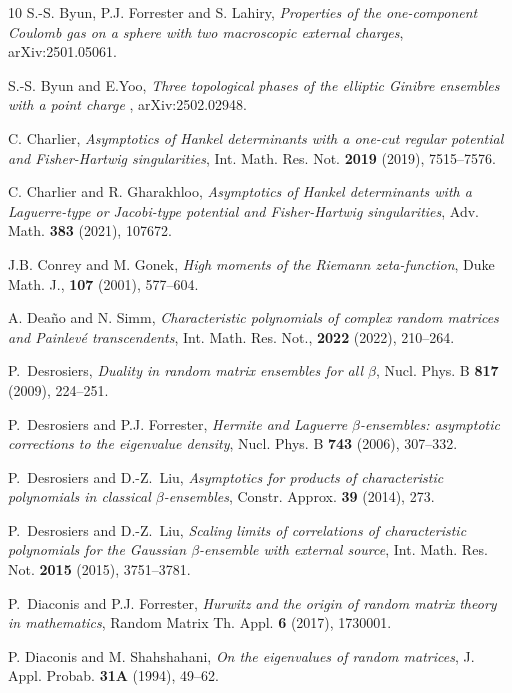 \documentclass[11pt,a4paper]{article}
\numberwithin{equation}{section} %
\theoremstyle{plain}
\theoremstyle{definition}
\numberwithin{prop}{section}
\numberwithin{cor}{section}
\numberwithin{remark}{section}
\begin{document}
\begin{thebibliography}{10}
S.-S. Byun, P.J. Forrester and S. Lahiry, \emph{Properties of the one-component Coulomb gas on a sphere
with two macroscopic external charges}, arXiv:2501.05061. 


S.-S. Byun and E.Yoo, \emph{Three topological phases of the elliptic Ginibre ensembles with a point charge }, arXiv:2502.02948.
  
  C. Charlier, \emph{Asymptotics of Hankel determinants with a one-cut regular potential and Fisher-Hartwig singularities}, Int. Math.
Res. Not.  \textbf{2019} (2019), 7515--7576.

C. Charlier and R. Gharakhloo, \emph{Asymptotics of Hankel determinants with a Laguerre-type or Jacobi-type potential and Fisher-Hartwig singularities}, Adv. Math. \textbf{383} (2021), 107672.
  
  J.B. Conrey and M. Gonek, \emph{High moments of the Riemann zeta-function}, Duke
Math. J., \textbf{107} (2001), 577--604.

 A. Dea\~{n}o and N. Simm, \emph{Characteristic polynomials of complex random matrices and Painlev\'e transcendents}, Int. Math. Res.
Not., \textbf{2022} (2022), 210--264.
  
  
  P.~Desrosiers, \emph{Duality in random matrix ensembles for all $\beta$}, Nucl. Phys. B \textbf{817}
(2009), 224--251.

P.~Desrosiers and P.J. Forrester, \emph{Hermite and {L}aguerre
  $\beta$-ensembles: asymptotic corrections to the eigenvalue density}, Nucl.
  Phys. B \textbf{743} (2006), 307--332.

P.~Desrosiers and D.-Z.~Liu, \emph{Asymptotics for products of characteristic polynomials in classical 
$\beta$-ensembles}, Constr. Approx. \textbf{39} (2014), 273.

  
P.~Desrosiers and D.-Z.~Liu,  \emph{Scaling limits of correlations of characteristic
polynomials for the Gaussian $\beta$-ensemble with external source}, Int. Math.
Res. Not. {\bf  2015} (2015), 3751--3781. 

P.~Diaconis and P.J. Forrester, \emph{Hurwitz and the origin of random matrix
  theory in mathematics}, Random Matrix Th. Appl. \textbf{6} (2017), 1730001.
  
  P. Diaconis and M. Shahshahani, \emph{On the eigenvalues of random matrices}, J. Appl.
Probab. \textbf{31A} (1994), 49--62.
  

\end{thebibliography}
\end{document}
